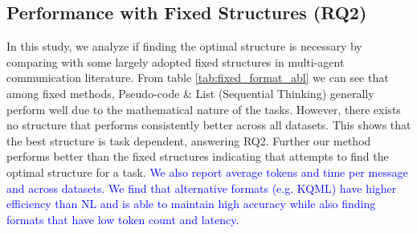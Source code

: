 \subsection{Performance with Fixed Structures (RQ2)}
In this study, we analyze if finding the optimal structure is necessary by comparing with some largely adopted fixed structures in multi-agent communication literature. 
From table \ref{tab:fixed_format_abl} we can see that among fixed methods, Pseudo-code \& List (Sequential Thinking) generally perform well due to the mathematical nature of the tasks. However, there exists no structure that performs consistently better across all datasets. This shows that the best structure is task dependent, answering RQ2. Further our method performs better than the fixed structures indicating that \method attempts to find the optimal structure for a task.
\textcolor{blue}{We also report average tokens and time per message and across datasets. We find that alternative formats (e.g. KQML) have higher efficiency than NL and \method is able to maintain high accuracy while also finding formats that have low token count and latency.}

